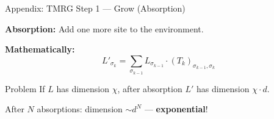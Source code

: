\documentclass[aspectratio=169, 11pt]{beamer}
\newcommand{\highlight}[1]{\textcolor{accentred}{\textbf{#1}}}
\begin{document}
\begin{frame}{Appendix: TMRG Step 1 --- Grow (Absorption)}
    
    \textbf{Absorption:} Add one more site to the environment.
    
    \vspace{0.3cm}
    
    \begin{center}
    \end{center}
    
    \vspace{0.3cm}
    
    \textbf{Mathematically:}
    \[
    L'_{\sigma_k} = \sum_{\sigma_{k-1}} L_{\sigma_{k-1}} \cdot (T_k)_{\sigma_{k-1}, \sigma_k}
    \]
    
    \begin{alertblock}{Problem}
        If $L$ has dimension $\chi$, after absorption $L'$ has dimension $\chi \cdot d$.
        
        After $N$ absorptions: dimension $\sim d^N$ --- \highlight{exponential}!
    \end{alertblock}
\end{frame}
\end{document}
